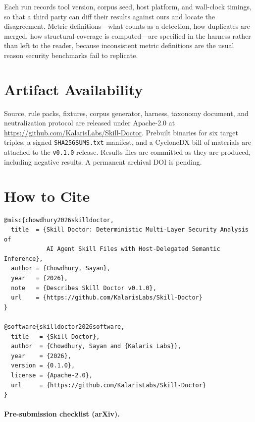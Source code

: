 \documentclass[11pt]{article}
\begin{document}
Each run records tool version, corpus seed, host platform, and wall-clock timings, so that a third party can diff their results against ours and locate the disagreement. Metric definitions---what counts as a detection, how duplicates are merged, how structural coverage is computed---are specified in the harness rather than left to the reader, because inconsistent metric definitions are the usual reason security benchmarks fail to replicate.

\section{Artifact Availability}

Source, rule packs, fixtures, corpus generator, harness, taxonomy document, and neutralization protocol are released under Apache-2.0 at \url{https://github.com/KalarisLabs/Skill-Doctor}. Prebuilt binaries for six target triples, a signed \texttt{SHA256SUMS.txt} manifest, and a CycloneDX bill of materials are attached to the \texttt{v0.1.0} release. Results files are committed as they are produced, including negative results. A permanent archival DOI is pending.

\section{How to Cite}

\begin{lstlisting}[caption={BibTeX entries for this paper and for the software artifact.}]
@misc{chowdhury2026skilldoctor,
  title  = {Skill Doctor: Deterministic Multi-Layer Security Analysis of
            AI Agent Skill Files with Host-Delegated Semantic Inference},
  author = {Chowdhury, Sayan},
  year   = {2026},
  note   = {Describes Skill Doctor v0.1.0},
  url    = {https://github.com/KalarisLabs/Skill-Doctor}
}

@software{skilldoctor2026software,
  title   = {Skill Doctor},
  author  = {Chowdhury, Sayan and {Kalaris Labs}},
  year    = {2026},
  version = {0.1.0},
  license = {Apache-2.0},
  url     = {https://github.com/KalarisLabs/Skill-Doctor}
}
\end{lstlisting}

\paragraph{Pre-submission checklist (arXiv).}
\end{document}
